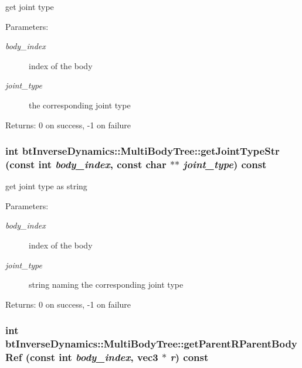 get joint type \begin{Desc}
\item[Parameters:]
\begin{description}
\item[{\em body\_\-index}]index of the body \item[{\em joint\_\-type}]the corresponding joint type \end{description}
\end{Desc}
\begin{Desc}
\item[Returns:]0 on success, -1 on failure \end{Desc}
\hypertarget{classbt_inverse_dynamics_1_1_multi_body_tree_6591655d73601c531baed6121f89add5}{
\subsubsection[getJointTypeStr]{\setlength{\rightskip}{0pt plus 5cm}int btInverseDynamics::MultiBodyTree::getJointTypeStr (const int {\em body\_\-index}, \/  const char $\ast$$\ast$ {\em joint\_\-type}) const}}
\label{classbt_inverse_dynamics_1_1_multi_body_tree_6591655d73601c531baed6121f89add5}


get joint type as string \begin{Desc}
\item[Parameters:]
\begin{description}
\item[{\em body\_\-index}]index of the body \item[{\em joint\_\-type}]string naming the corresponding joint type \end{description}
\end{Desc}
\begin{Desc}
\item[Returns:]0 on success, -1 on failure \end{Desc}
\hypertarget{classbt_inverse_dynamics_1_1_multi_body_tree_d7b1596a98a55cd32c3af072a82dcade}{
\subsubsection[getParentRParentBodyRef]{\setlength{\rightskip}{0pt plus 5cm}int btInverseDynamics::MultiBodyTree::getParentRParentBodyRef (const int {\em body\_\-index}, \/  {\bf vec3} $\ast$ {\em r}) const}}
\label{classbt_inverse_dynamics_1_1_multi_body_tree_d7b1596a98a55cd32c3af072a82dcade}


